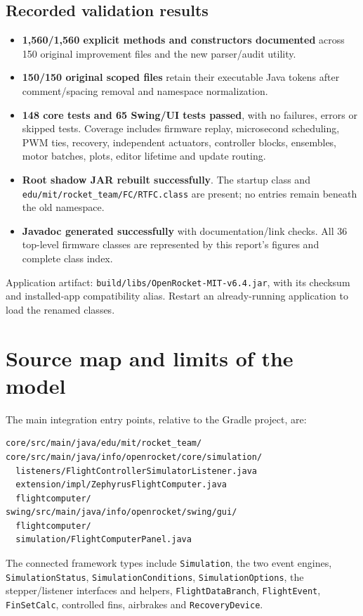 \documentclass[10pt,letterpaper]{article}
\newcommand{\code}[1]{\nolinkurl{#1}}
\newcommand{\class}[1]{\nolinkurl{#1}}
\begin{document}
\subsection{Recorded validation results}
\begin{itemize}
\item \textbf{1,560/1,560 explicit methods and constructors documented} across
150 original improvement files and the new parser/audit utility.
\item \textbf{150/150 original scoped files} retain their executable Java
tokens after comment/spacing removal and namespace normalization.
\item \textbf{148 core tests and 65 Swing/UI tests passed}, with no failures,
errors or skipped tests. Coverage includes firmware replay, microsecond
scheduling, PWM ties, recovery, independent actuators, controller blocks,
ensembles, motor batches, plots, editor lifetime and update routing.
\item \textbf{Root shadow JAR rebuilt successfully}. The startup class and
\code{edu/mit/rocket_team/FC/RTFC.class} are present; no entries remain beneath
the old namespace.
\item \textbf{Javadoc generated successfully} with documentation/link checks.
All 36 top-level firmware classes are represented by this report's figures
and complete class index.
\end{itemize}

Application artifact: \code{build/libs/OpenRocket-MIT-v6.4.jar}, with its
checksum and installed-app compatibility alias. Restart an already-running
application to load the renamed classes.

\clearpage
\section{Source map and limits of the model}
The main integration entry points, relative to the Gradle project, are:
\begin{lstlisting}
core/src/main/java/edu/mit/rocket_team/
core/src/main/java/info/openrocket/core/simulation/
  listeners/FlightControllerSimulatorListener.java
  extension/impl/ZephyrusFlightComputer.java
  flightcomputer/
swing/src/main/java/info/openrocket/swing/gui/
  flightcomputer/
  simulation/FlightComputerPanel.java
\end{lstlisting}
The connected framework types include \class{Simulation}, the two event
engines, \class{SimulationStatus}, \class{SimulationConditions},
\class{SimulationOptions}, the stepper/listener interfaces and helpers,
\class{FlightDataBranch}, \class{FlightEvent}, \class{FinSetCalc}, controlled
fins, airbrakes and \class{RecoveryDevice}.
\end{document}
